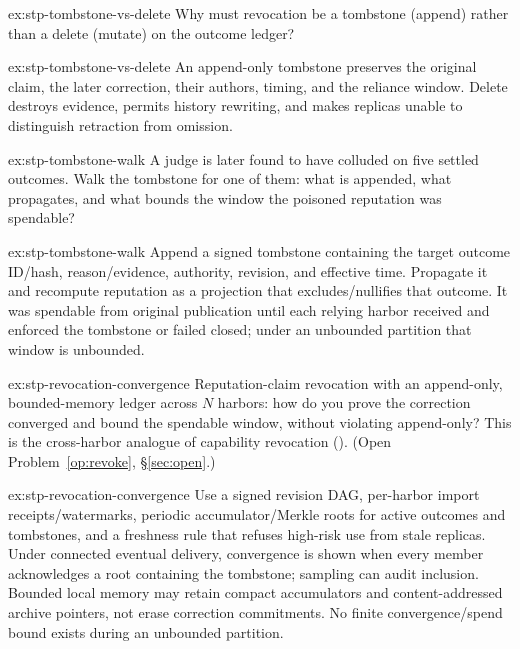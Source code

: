 \documentclass[11pt,a4paper]{article}
\theoremstyle{definition}
\begin{document}
\begin{pdexercise}[kind=Check,rating=1]{ex:stp-tombstone-vs-delete}
Why must revocation be a tombstone (append) rather than a delete (mutate) on
the outcome ledger?
\end{pdexercise}
\begin{pdsolution}{ex:stp-tombstone-vs-delete}
An append-only tombstone preserves the original claim, the later correction,
their authors, timing, and the reliance window. Delete destroys evidence,
permits history rewriting, and makes replicas unable to distinguish
retraction from omission.
\end{pdsolution}
\begin{pdexercise}[kind=Trace,rating=2]{ex:stp-tombstone-walk}
A judge is later found to have colluded on five settled outcomes. Walk the
tombstone for one of them: what is appended, what propagates, and what
bounds the window the poisoned reputation was spendable?
\end{pdexercise}
\begin{pdsolution}{ex:stp-tombstone-walk}
Append a signed tombstone containing the target outcome ID/hash,
reason/evidence, authority, revision, and effective time. Propagate it and
recompute reputation as a projection that excludes/nullifies that outcome.
It was spendable from original publication until each relying harbor
received and enforced the tombstone or failed closed; under an unbounded
partition that window is unbounded.
\end{pdsolution}
\begin{pdexercise}[kind=Open,rating=3]{ex:stp-revocation-convergence}
Reputation-claim revocation with an append-only, bounded-memory ledger across
$N$ harbors: how do you prove the correction converged and bound the
spendable window, without violating append-only? This is the cross-harbor
analogue of capability revocation (). (Open
Problem~\ref{op:revoke}, \S\ref{sec:open}.)
\end{pdexercise}
\begin{pdsolution}{ex:stp-revocation-convergence}
Use a signed revision DAG, per-harbor import receipts/watermarks, periodic
accumulator/Merkle roots for active outcomes and tombstones, and a freshness
rule that refuses high-risk use from stale replicas. Under connected
eventual delivery, convergence is shown when every member acknowledges a
root containing the tombstone; sampling can audit inclusion. Bounded local
memory may retain compact accumulators and content-addressed archive
pointers, not erase correction commitments. No finite convergence/spend
bound exists during an unbounded partition.
\end{pdsolution}
\end{document}
